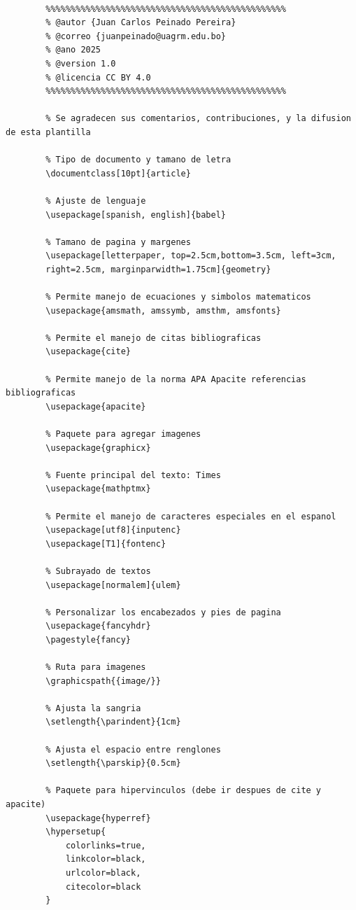 \documentclass[10pt,twocolumn,a4paper]{article}
\begin{document}
    \begin{lstlisting}[style=mystyle]
      
        %%%%%%%%%%%%%%%%%%%%%%%%%%%%%%%%%%%%%%%%%%%%%%%%
        % @autor {Juan Carlos Peinado Pereira}
        % @correo {juanpeinado@uagrm.edu.bo}
        % @ano 2025
        % @version 1.0
        % @licencia CC BY 4.0
        %%%%%%%%%%%%%%%%%%%%%%%%%%%%%%%%%%%%%%%%%%%%%%%%
    
        % Se agradecen sus comentarios, contribuciones, y la difusion de esta plantilla
        
        % Tipo de documento y tamano de letra
        \documentclass[10pt]{article}
        
        % Ajuste de lenguaje
        \usepackage[spanish, english]{babel}
        
        % Tamano de pagina y margenes
        \usepackage[letterpaper, top=2.5cm,bottom=3.5cm, left=3cm, 
        right=2.5cm, marginparwidth=1.75cm]{geometry}
        
        % Permite manejo de ecuaciones y simbolos matematicos
        \usepackage{amsmath, amssymb, amsthm, amsfonts}
        
        % Permite el manejo de citas bibliograficas
        \usepackage{cite}
        
        % Permite manejo de la norma APA Apacite referencias bibliograficas
        \usepackage{apacite}
        
        % Paquete para agregar imagenes
        \usepackage{graphicx}
        
        % Fuente principal del texto: Times
        \usepackage{mathptmx}
        
        % Permite el manejo de caracteres especiales en el espanol
        \usepackage[utf8]{inputenc} 
        \usepackage[T1]{fontenc}
        
        % Subrayado de textos
        \usepackage[normalem]{ulem}
        
        % Personalizar los encabezados y pies de pagina
        \usepackage{fancyhdr}
        \pagestyle{fancy}
        
        % Ruta para imagenes
        \graphicspath{{image/}}
        
        % Ajusta la sangria
        \setlength{\parindent}{1cm}
        
        % Ajusta el espacio entre renglones
        \setlength{\parskip}{0.5cm}
        
        % Paquete para hipervinculos (debe ir despues de cite y apacite)
        \usepackage{hyperref}
        \hypersetup{
            colorlinks=true,
            linkcolor=black,
            urlcolor=black,
            citecolor=black
        }
        

\end{lstlisting}
\end{document}
